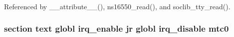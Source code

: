 Referenced by \-\_\-\-\_\-attribute\-\_\-\-\_\-(), ns16550\-\_\-read(), and soclib\-\_\-tty\-\_\-read().

\hypertarget{mips_2irq_8S_ac1d8c155e12dea1db68be9995a69b3da}{
\subsubsection[{mtc0}]{\setlength{\rightskip}{0pt plus 5cm}section text globl {\bf irq\-\_\-enable} jr globl {\bf irq\-\_\-disable} mtc0}}\label{mips_2irq_8S_ac1d8c155e12dea1db68be9995a69b3da}
